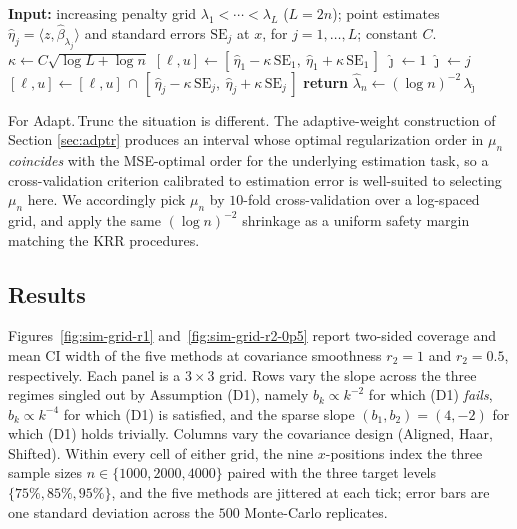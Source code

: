 \documentclass[aos]{imsart}
\renewcommand{\hat}{\widehat}
\theoremstyle{plain}
\theoremstyle{definition}
\theoremstyle{definition}
\begin{document}
\begin{algorithm}[!htbp]
\caption{Lepski-type selection of the undersmoothed penalty $\lambda_n$ at a test point $x$.}
\label{alg:lepski}
\begin{algorithmic}[1]
\State \textbf{Input:} increasing penalty grid $\lambda_1<\cdots<\lambda_L$ ($L=2n$); point estimates $\hat\eta_j=\langle z,\hat\beta_{\lambda_j}\rangle$ and standard errors $\mathrm{SE}_j$ at $x$, for $j=1,\dots,L$; constant $C$.
\State $\kappa \gets C\sqrt{\log L+\log n}$
\State $[\ell,u]\gets[\,\hat\eta_1-\kappa\,\mathrm{SE}_1,\ \hat\eta_1+\kappa\,\mathrm{SE}_1\,]$ 
\State $\hat\jmath\gets 1$
  \If{$\hat\eta_j\in[\ell,u]$} 
     \State $\hat\jmath\gets j$
  \EndIf
  \State $[\ell,u]\gets[\ell,u]\,\cap\,[\,\hat\eta_j-\kappa\,\mathrm{SE}_j,\ \hat\eta_j+\kappa\,\mathrm{SE}_j\,]$
\EndFor
\State \textbf{return} $\hat\lambda_n\gets (\log n)^{-2}\,\lambda_{\hat\jmath}$ 
\end{algorithmic}
\end{algorithm}

For Adapt.\,Trunc the situation is different. The adaptive-weight construction of Section \ref{sec:adptr} produces an interval whose optimal regularization order in $\mu_n$ \emph{coincides} with the MSE-optimal order for the underlying estimation task, so a cross-validation criterion calibrated to estimation error is well-suited to selecting $\mu_n$ here. We accordingly pick $\mu_n$ by $10$-fold cross-validation over a log-spaced grid, and apply the same $(\log n)^{-2}$ shrinkage as a uniform safety margin matching the KRR procedures.

\subsection{Results}\label{subsec:sim-results}

Figures~\ref{fig:sim-grid-r1} and~\ref{fig:sim-grid-r2-0p5} report two-sided coverage and mean CI width of the five methods at covariance smoothness $r_2=1$ and $r_2=0.5$, respectively. Each panel is a $3\times 3$ grid. Rows vary the slope across the three regimes singled out by Assumption (D1), namely $b_k\propto k^{-2}$ for which (D1) \emph{fails}, $b_k\propto k^{-4}$ for which (D1) is satisfied, and the sparse slope $(b_1,b_2)=(4,-2)$ for which (D1) holds trivially. Columns vary the covariance design (Aligned, Haar, Shifted). Within every cell of either grid, the nine $x$-positions index the three sample sizes $n\in\{1000,2000,4000\}$ paired with the three target levels $\{75\%,85\%,95\%\}$, and the five methods are jittered at each tick; error bars are one standard deviation across the $500$ Monte-Carlo replicates.
\end{document}

